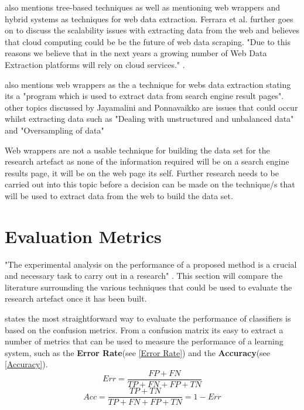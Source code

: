 \cite{FERRARA2014301} also mentions tree-based techniques as well as mentioning web wrappers and hybrid systems as techniques for web data extraction. Ferrara et al. further goes on to discuss the scalability issues with extracting data from the web and believes that cloud computing could be be the future of web data scraping. "Due to this reasons we believe that in the next years a growing number of Web Data Extraction platforms will rely on cloud services." \cite{FERRARA2014301}.


\cite{8186676} also mentions web wrappers as the a technique for webs data extraction stating its a "program which
is used to extract data from search engine result pages". other topics discussed by Jayamalini and Ponnavaikko are issues that could occur whilst extracting data such as "Dealing with unstructured and unbalanced data" and "Oversampling of data" \cite{8186676}

Web wrappers are not a usable technique for building the data set for the research artefact as none of the information required will be on a search engine results page, it will be on the web page its self. Further research needs to be carried out into this topic before a decision can be made on the technique/s that will be used to extract data from the web to build the data set.


\section{Evaluation Metrics}
"The experimental analysis on the performance
of a proposed method is a crucial and necessary task to
carry out in a research" \cite{GarcÃa2008}. This section will compare the literature surrounding the various techniques that could be used to evaluate the research artefact once it has been built. 

\cite{Batista:2004:SBS:1007730.1007735} states the most straightforward way to evaluate the performance of classifiers is based on the confusion metrics. From a confusion matrix its easy to extract a number of metrics that can be used to measure the performance of a learning system, such as the \textbf{Error Rate}(see \ref{Error Rate}) and the \textbf{Accuracy}(see \ref{Accuracy}). 
\begin{equation}
    Err = \frac{ FP + FN }{ TP + FN + FP + TN}
    \label{Error Rate}
\end{equation}
\begin{equation}
    Acc = \frac{TP + TN}{TP + FN +FP + TN} = 1- Err
    \label{Accuracy}
\end{equation}

